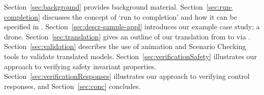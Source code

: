 Section~\ref{sec:background} provides background material. 
Section~\ref{sec:run-completion} discusses the \SC concept of `run to completion' and how it can be specified in \EventB. 
Section~\ref{sec:descr-sample-appl} introduces our example case study; a drone. 
Section~\ref{sec:translation} gives an outline of our translation from \SCXML to \EventB via \UMLB.
Section~\ref{sec:validation} describes the use of \UMLB animation and Scenario Checking tools to validate translated \SCXML models.
Section~\ref{sec:verificationSafety} illustrates our approach to verifying safety invariant properties. 
Section~\ref{sec:verificationResponses} illustrates our approach to verifying control responses, and 
Section~\ref{sec:conc} concludes.





